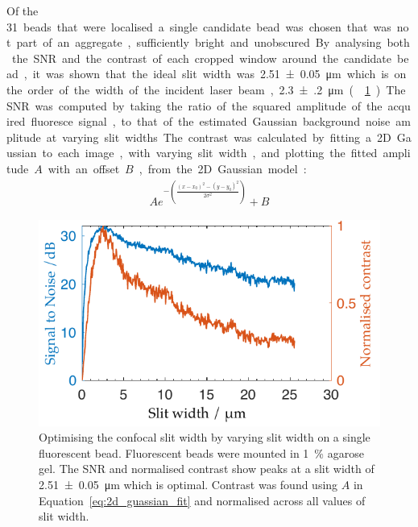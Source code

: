Of the \SI{31} beads that were localised a single candidate bead was chosen that
was not part of an aggregate,
sufficiently bright and unobscured.
By analysing both the \gls{SNR} and the contrast of each cropped window around the candidate bead, it was shown that the ideal slit width was \SI{2.51(5)}{\micro\metre} which is on the order of the width of the incident laser beam, \SI{2.3(2)}{\micro\metre} (\figurename~\ref{fig:optimal_slit_snr_contrast}).
The \gls{SNR} was computed by taking the ratio of the squared amplitude of the acquired fluoresce signal, to that of the estimated Gaussian background noise amplitude at varying slit widths.
The contrast was calculated by fitting a \gls{2D} Gaussian to each image, with varying slit width, and plotting the fitted amplitude \(A\) with an offset \(B\), from the \gls{2D} Gaussian model:
\begin{align}
  A e^{-\left(\frac{{(x-x_0)}^2-{(y-y_0)}^2}{2\sigma^2}\right)}+B \label{eq:2d_guassian_fit}
\end{align}
\begin{figure}
  \centering
  \includegraphics{Chapters/dualslit/Figs/PDF/optimal_slit_snr_contrast}
  \caption[Optimising the confocal slit width by varying slit width on a single fluorescent bead.]{
  Optimising the confocal slit width by varying slit width on a single fluorescent bead.
  Fluorescent beads were mounted in \SI{1}{\percent} agarose gel.
  The \gls{SNR} and normalised contrast show peaks at a slit width of \SI{2.51(5)}{\micro\metre} which is optimal.
  Contrast was found using \( A\) in Equation~\eqref{eq:2d_guassian_fit} and normalised across all values of slit width.
  }\label{fig:optimal_slit_snr_contrast}
\end{figure}
